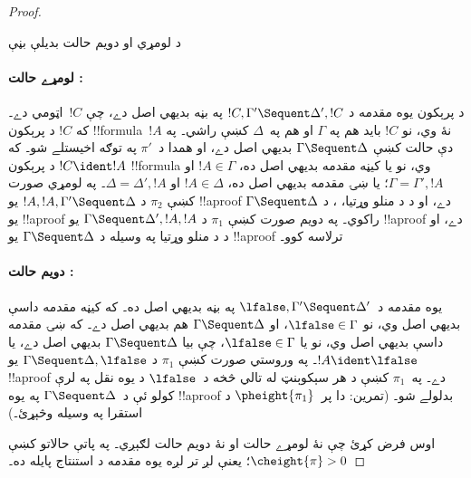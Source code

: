 \documentclass[../../../include/open-logic-section]{subfiles}
\begin{document}
\begin{proof}
\begin{center}
د لومړي او دويم حالت بديلې بڼې
\end{center}

\paragraph{لومړے حالت :} د پرېکون يوه مقدمه د $!C, \Gamma' \Sequent \Delta', !C$ په بڼه بديهي اصل دے، چې $!C$~اټومي دے۔ که $!C$ د پرېکون !!{formula}~$!A$ نۀ وي، نو $!C$ بايد هم په $\Gamma$ او هم په~$\Delta$ کښې راشي۔ په دې حالت کښې $\Gamma \Sequent \Delta$ بديهي اصل دے، او همدا د~$\pi'$ په توګه اخيستلے شو۔ که $!C \ident !A$ د پرېکون !!{formula} وي، نو يا کيڼه مقدمه بديهي اصل ده، $!A \in \Gamma$ او $\Gamma = \Gamma', !A$؛ يا ښۍ مقدمه بديهي اصل ده، $!A \in
\Delta$ او $\Delta = \Delta', !A$۔ په لومړي صورت کښې $\pi_2$ د $!A, !A, \Gamma' \Sequent \Delta$ يو !!a{proof} دے، او د \LeftR{\Contraction} د منلو وړتيا، ، د $\Gamma \Sequent \Delta$ يو !!a{proof} راکوي۔ په دويم صورت کښې $\pi_1$ د $\Gamma \Sequent \Delta', !A, !A$ يو !!a{proof} دے، او د \RightR{\Contraction} د منلو وړتيا په وسيله د $\Gamma \Sequent
\Delta$ يو !!a{proof} ترلاسه کوو۔

\paragraph{دويم حالت :} يوه مقدمه د~$\lfalse, \Gamma' \Sequent \Delta'$ په بڼه بديهي اصل ده۔ که کيڼه مقدمه داسې بديهي اصل وي، نو $\lfalse \in \Gamma$، او $\Gamma \Sequent \Delta$ هم بديهي اصل دے۔ که ښۍ مقدمه داسې بديهي اصل وي، نو يا $\lfalse \in \Gamma$، چې بيا $\Gamma \Sequent \Delta$ بديهي اصل دے، يا $!A \ident \lfalse$۔ په وروستي صورت کښې $\pi_1$ د $\Gamma \Sequent \Delta, \lfalse$ يو !!a{proof} دے۔ په~$\pi_1$ کښې د هر سېکوېنټ له تالي څخه د~$\lfalse$ د يوه نقل په لرې کولو ئې د~$\Gamma \Sequent \Delta$ په يوه !!a{proof} بدلولے شو۔ (تمرين: دا پر~$\pheight{\pi_1}$ د استقرا په وسيله وڅېړئ۔)

اوس فرض کړئ چې نۀ لومړے حالت او نۀ دويم حالت لګېږي۔ په پاتې حالاتو کښې $\cheight{\pi} > 0$؛ يعنې لږ تر لږه يوه مقدمه د استنتاج پايله ده۔


\end{proof}
\end{document}
